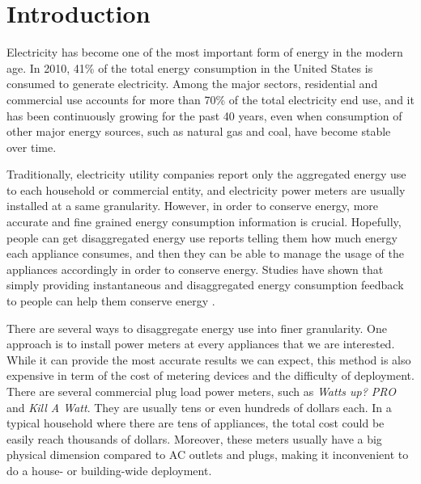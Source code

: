 \chapter{Introduction}\label{chap1}

Electricity has become one of the most important form of energy in the modern age. In 2010, 41\% of the total energy consumption in the United States is consumed to generate electricity. Among the major sectors, residential and commercial use accounts for more than 70\% of the total electricity end use, and it has been continuously growing for the past 40 years, even when consumption of other major energy sources, such as natural gas and coal, have become stable over time. \cite{U.S.EnergyInformationAdministration2011}

Traditionally, electricity utility companies report only the aggregated energy use to each household or commercial entity, and electricity power meters are usually installed at a same granularity. However, in order to conserve energy, more accurate and fine grained energy consumption information is crucial. Hopefully, people can get disaggregated energy use reports telling them how much energy each appliance consumes, and then they can be able to manage the usage of the appliances accordingly in order to conserve energy. Studies have shown that simply providing instantaneous and disaggregated energy consumption feedback to people can help them conserve energy \cite{Darby2006,Parker2006,Fischer2008}.


There are several ways to disaggregate energy use into finer granularity. One approach is to install power meters at every appliances that we are interested. While it can provide the most accurate results we can expect, this method is also expensive in term of the cost of metering devices and the difficulty of deployment. There are several commercial plug load power meters, such as \textit{Watts up? PRO} and \textit{Kill A Watt}. They are usually tens or even hundreds of dollars each. In a typical household where there are tens of appliances, the total cost could be easily reach thousands of dollars. Moreover, these meters usually have a big physical dimension compared to AC outlets and plugs, making it inconvenient to do a house- or building-wide deployment. 

